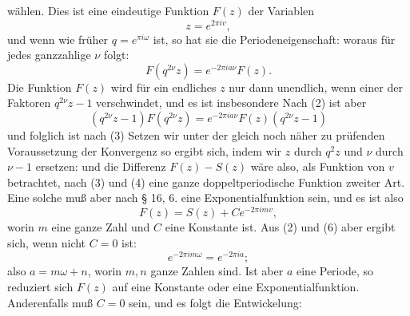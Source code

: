 wählen. Dies ist eine eindeutige Funktion $F(z)$ der Variablen
\[
z = e^{2\pi iv},
\]
und wenn wie früher $q = e^{\pi i\omega}$ ist, so hat sie die Periodeneigenschaft:
woraus für jedes ganzzahlige $\nu$ folgt:
\[
F(q^{2\nu}z) = e^{-2\pi ia\nu}F(z).
\]
Die Funktion $F(z)$ wird für ein endliches $z$ nur dann unendlich,
wenn einer der Faktoren $q^{2\nu}z - 1$ verschwindet, und es
ist insbesondere
Nach (2) ist aber
\[
(q^{2\nu}z - 1)F(q^{2\nu}z) = e^{-2\pi ia\nu}F(z)(q^{2\nu}z - 1)
\]
und folglich ist nach (3)
Setzen wir unter der gleich noch näher zu prüfenden Voraussetzung
 der Konvergenz
so ergibt sich, indem wir $z$ durch $q^2z$ und $\nu$ durch $\nu - 1$ ersetzen:
und die Differenz $F(z) - S(z)$ wäre also, als Funktion von $v$
betrachtet, nach (3) und (4) eine ganze doppeltperiodische Funktion
 zweiter Art. Eine solche muß aber nach § 16, 6. eine Exponentialfunktion
 sein, und es ist also
\[
F(z) = S(z) + Ce^{-2\pi imv},
\]
worin $m$ eine ganze Zahl und $C$ eine Konstante ist. Aus (2) und
(6) aber ergibt sich, wenn nicht $C = 0$ ist:
\[
e^{-2\pi im\omega} = e^{-2\pi ia};
\]
also $a = m\omega + n$, worin $m, n$ ganze Zahlen sind. Ist aber $a$
eine Periode, so reduziert sich $F(z)$ auf eine Konstante oder eine
Exponentialfunktion. Anderenfalls muß $C = 0$ sein, und es folgt
die Entwickelung:
